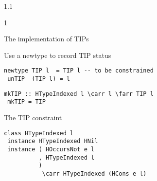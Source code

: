 \documentclass{slides}
\newenvironment{myslide}{\begin{slide}\color{Blue}\begin{boxedminipage}{1.1\hsize}\begin{boxedminipage}{1\hsize}\color{Black}
\vspace{-170\in}
}{%
\smallskip
\end{boxedminipage}
\end{boxedminipage}
\end{slide}}
\newenvironment{myslide}{\begin{slide}
}{%
\end{slide}}
\newenvironment{myslide}{\begin{slide}\color{White}\begin{boxedminipage}{1.1\hsize}\color{Black}
\vspace{-170\in}
}{%
\smallskip
\end{boxedminipage}
\end{slide}}
\newcommand{\header}[1]{{\large \color{Red} #1}}
\newcommand{\blau}[1]{{\vspace{-50\in}\normalsize \color{Blue} #1}}
\newcommand{\farr}{\ensuremath{\to}}
\newcommand{\carr}{\ensuremath{\Rightarrow}}
\begin{document}
\begin{myslide}

\header{The implementation of TIPs}

\vspace{-77\in}

\blau{Use a newtype to record TIP status}

\smallskip

\begin{Verbatim}[fontfamily=courier,fontsize=\small,commandchars=\\\{\}]
 newtype TIP l  = TIP l -- to be constrained
 unTIP  (TIP l) = l
\end{Verbatim}
\smallskip
\begin{Verbatim}[fontfamily=courier,fontsize=\small,commandchars=\\\{\}]
 mkTIP :: HTypeIndexed l \carr l \farr TIP l
 mkTIP = TIP
\end{Verbatim}

\vspace{-77\in}

\blau{The TIP constraint}

\smallskip

\begin{Verbatim}[fontfamily=courier,fontsize=\small,commandchars=\\\{\}]
 class HTypeIndexed l
 instance HTypeIndexed HNil
 instance ( HOccursNot e l
          , HTypeIndexed l
          )
           \carr HTypeIndexed (HCons e l)
\end{Verbatim}

\end{myslide}



\end{document}
